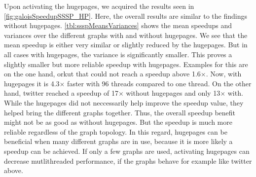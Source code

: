 Upon activating the hugepages, we acquired the results seen in \autoref{fig:galoisSpeedupSSSP_HP}. Here, the overall results are similar to the findings without hugepages. \autoref{tbl:ssspMeansVariances} shows the mean speedups and variances over the different graphs with and without hugepages. We see that the mean speedup is either very similar or slightly reduced by the hugepages. But in all cases with hugepages, the variance is significantly smaller. This proves a slightly smaller but more reliable speedup with hugepages.
Examples for this are on the one hand, orkut that could not reach a speedup above 1.6$\times$. Now, with hugepages it is 4.3$\times$ faster with 96 threads compared to one thread. On the other hand, twitter reached a speedup of 17$\times$ without hugepages and only 13$\times$ with.
While the hugepages did not neccessarily help improve the speedup value, they helped bring the different graphs together. 
Thus, the overall speedup benefit might not be as good as without hugepages. 
But the speedup is much more reliable regardless of the graph topology. 
In this regard, hugepages can be beneficial when many different graphs are in use, because it is more likely a speedup can be achieved. 
If only a few graphs are used, activating hugepages can decrease mutlithreaded performance, if the graphs behave for example like twitter above.

